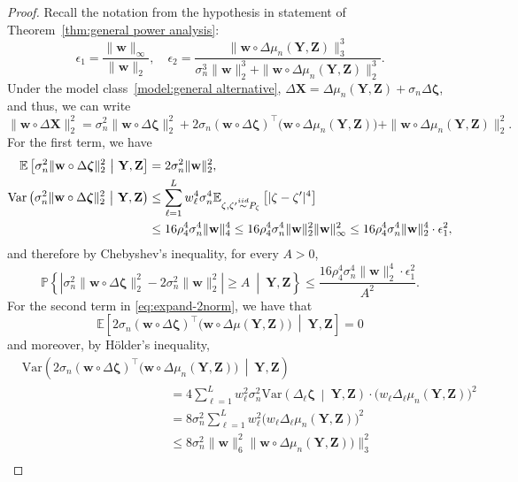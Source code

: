 \documentclass[12pt]{article}
\newcommand{\eps}{\varepsilon}
\newcommand{\EEst}[2]{\mathbb{E}\left[{#1}\  \middle| \ {#2}\right]}
\newcommand{\VVst}[2]{\mathrm{Var}\left({#1}\  \middle| \ {#2}\right)}
\newcommand{\Ep}[2]{\mathbb{E}_{{#1}}\left[{#2}\right]}
\newcommand{\PPst}[2]{\mathbb{P}\left\{{#1}\  \middle| \ {#2}\right\}}
\newcommand{\iidsim}{\stackrel{\textnormal{iid}}{\sim}}
\newcommand{\bX}{\mathbf{X}}
\newcommand{\bY}{\mathbf{Y}}
\newcommand{\bZ}{\mathbf{Z}}
\newcommand{\bw}{\mathbf{w}}
\newcommand{\bzeta}{\mathbf{\eps}}
\def\bzeta{{\boldsymbol{\zeta}}}
\begin{document}
\begin{proof}
Recall the notation from the hypothesis in statement of Theorem~\ref{thm:general power analysis}:
\[
\epsilon_1 = \frac{\|\bw\|_\infty}{\|\bw\|_2}, \quad \epsilon_2 = \frac{\|\bw\circ\Delta\mu_n(\bY,\bZ)\|^3_3}{\sigma_n^3\|\bw\|^3_2 + \|\bw\circ\Delta\mu_n(\bY,\bZ)\|^3_2}.
\]
Under the model class~\eqref{model:general alternative}, $\Delta\bX = \Delta\mu_n(\bY,\bZ) + \sigma_n\Delta\bzeta$, and thus, we can write
\begin{equation}\label{eq:expand-2norm}
    \|\bw\circ \Delta\bX\|^2_2 = \sigma_n^2\|\bw\circ \Delta\bzeta\|^2_2 + 2\sigma_n (\bw\circ \Delta\bzeta)^\top \bigl(\bw\circ \Delta\mu_n(\bY,\bZ)\bigr) + \|\bw\circ \Delta\mu_n(\bY,\bZ)\|^2_2.
\end{equation}
For the first term, we have
\begin{align*}
    \EEst{\sigma_n^2\|\bw\circ \Delta\bzeta\|^2_2}{\bY,\bZ} &= 2\sigma_n^2\|\bw\|^2_2,\\
    \VVst{\sigma_n^2\|\bw\circ \Delta\bzeta\|^2_2}{\bY,\bZ} &\leq  \sum_{\ell=1}^L w_\ell^4\sigma_n^4 \Ep{\zeta,\zeta'\iidsim P_\zeta}{|\zeta - \zeta'|^4} \\
    &\leq 16\rho^4_4\sigma_n^4\|\bw\|^4_4 \leq 16\rho^4_4\sigma_n^4\|\bw\|^2_2\|\bw\|^2_\infty \leq  16\rho^4_4\sigma_n^4\|\bw\|^4_2\cdot \epsilon_1^2,
\end{align*}
and therefore by Chebyshev's inequality, for every $A > 0$,
\[\PPst{\left|\sigma_n^2\|\bw\circ \Delta\bzeta\|^2_2 - 2\sigma_n^2\|\bw\|^2_2 \right|\geq A}{\bY,\bZ} \leq\frac{16\rho^4_4\sigma_n^4\|\bw\|^4_2\cdot \epsilon_1^2}{A^2}.
\]
For the second term in \eqref{eq:expand-2norm}, we have that
\[
\EEst{2\sigma_n(\bw\circ \Delta\bzeta)^\top \bigl(\bw\circ \Delta\mu(\bY,\bZ)\bigr)}{\bY,\bZ} = 0
\]
and moreover, by H{\"o}lder's inequality,
\begin{align*}
&\VVst{2\sigma_n(\bw\circ \Delta\bzeta)^\top \bigl(\bw\circ \Delta\mu_n(\bY,\bZ)\bigr)}{\bY,\bZ} \\
&\hspace{5cm}=
4\sum_{\ell=1}^L w_\ell^2\sigma_n^2 \VVst{\Delta_\ell \bzeta}{\bY,\bZ} \cdot \bigl(w_\ell \Delta_\ell\mu_n(\bY,\bZ)\bigr)^2\\
&\hspace{5cm}=8\sigma_n^2  \sum_{\ell=1}^L w_\ell^2 \bigl(w_\ell \Delta_\ell\mu_n(\bY,\bZ)\bigr)^2 \\
&\hspace{5cm}\leq 8\sigma_n^2 \|\bw\|_6^{2} \|\bw\circ \Delta\mu_n(\bY,\bZ))\|_3^2\\

\end{align*}
\end{proof}
\end{document}
